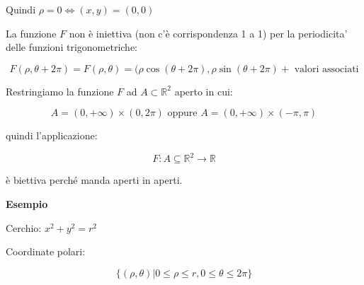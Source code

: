 \documentclass[../appunti-analisi.tex]{subfiles}
\begin{document}
Quindi $\rho=0 \Leftrightarrow (x,y) = (0,0)$

La funzione $F$ non è iniettiva (non c'è corrispondenza 1 a 1) per la periodicita' delle funzioni trigonometriche:

\[
    F(\rho, \theta + 2\pi) = F(\rho,\theta) = (\rho \cos (\theta+ 2\pi), \rho \sin (\theta + 2\pi) + \text{ valori associati}
\]

Restringiamo la funzione $F$ ad $A \subset \mathbb{R}^{2}$ aperto in cui:

\[
    A = (0, +\infty) \times (0, 2\pi) \text{ oppure } A=(0, +\infty) \times (-\pi, \pi)
\]

quindi l'applicazione:

\[
    F: A \subseteq \mathbb{R}^{2} \rightarrow \mathbb{R}
\]

è biettiva perché manda aperti in aperti.

\newpage


\textbf{Esempio} 

Cerchio: $x^{2}+y^{2}=r^{2}$

Coordinate polari:

\[
    \{(\rho,\theta) | 0 \le \rho \le r, 0 \le \theta \le  2\pi\}
\]
\end{document}
